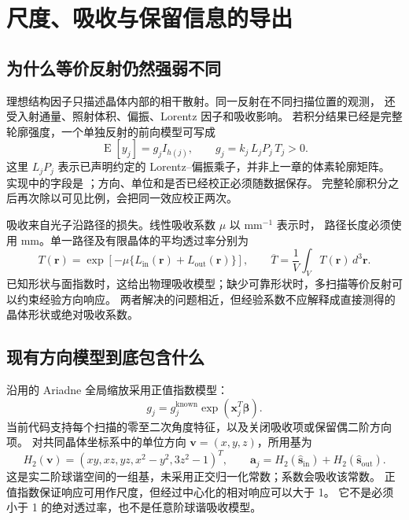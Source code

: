 \chapter{尺度、吸收与保留信息的导出}
\label{chap:scaling}

\section{为什么等价反射仍然强弱不同}

理想结构因子只描述晶体内部的相干散射。同一反射在不同扫描位置的观测，
还受入射通量、照射体积、偏振、Lorentz 因子和吸收影响。
若积分结果已经是完整轮廓强度，一个单独反射的前向模型可写成
\begin{equation}
 \operatorname{E}[y_j]=g_jI_{h(j)},\qquad
 g_j=k_j\,L_jP_j\,T_j>0.
 \label{eq:scaling-forward}
\end{equation}
这里 $L_jP_j$ 表示已声明约定的 Lorentz--偏振乘子，并非上一章的体素轮廓矩阵。
实现中的字段是 ；方向、单位和是否已经校正必须随数据保存。
完整轮廓积分之后再次除以可见比例，会把同一效应校正两次。

吸收来自光子沿路径的损失。线性吸收系数 $\mu$ 以 mm$^{-1}$ 表示时，
路径长度必须使用 mm。单一路径及有限晶体的平均透过率分别为
\begin{equation}
 T(\bm r)=\exp[-\mu\{L_{\mathrm{in}}(\bm r)+L_{\mathrm{out}}(\bm r)\}],
 \qquad
 \overline T=\frac{1}{V}\int_V T(\bm r)\,d^3\bm r.
 \label{eq:scaling-absorption}
\end{equation}
已知形状与面指数时，这给出物理吸收模型；缺少可靠形状时，多扫描等价反射可以约束经验方向响应。
两者解决的问题相近，但经验系数不应解释成直接测得的晶体形状或绝对吸收系数\cite{scaling2020}。

\section{现有方向模型到底包含什么}

沿用的 Ariadne 全局缩放采用正值指数模型：
\begin{equation}
 g_j=g_j^{\mathrm{known}}\exp(\bm x_j^T\bm\beta).
 \label{eq:scaling-exponential}
\end{equation}
当前代码支持每个扫描的零至二次角度特征，以及关闭吸收项或保留偶二阶方向项。
对共同晶体坐标系中的单位方向 $\bm v=(x,y,z)$，所用基为
\begin{equation}
 H_2(\bm v)=
 (xy,xz,yz,x^2-y^2,3z^2-1)^T,\qquad
 \bm a_j=H_2(\widehat{\bm s}_{\mathrm{in}})
          +H_2(\widehat{\bm s}_{\mathrm{out}}).
 \label{eq:scaling-harmonics}
\end{equation}
这是实二阶球谐空间的一组基，未采用正交归一化常数；系数会吸收该常数。
正值指数保证响应可用作尺度，但经过中心化的相对响应可以大于 1。
它不是必须小于 1 的绝对透过率，也不是任意阶球谐吸收模型。

